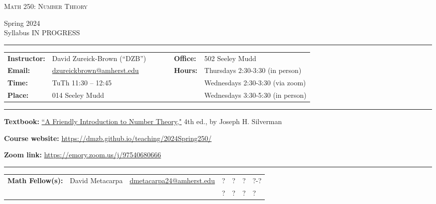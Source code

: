 \documentclass[12pt]{article}
\begin{document}
\begin{center}
{\Large \textsc{Math 250: Number Theory}}
\end{center}
\begin{center}
  Spring 2024
  \\
  {\color{red}Syllabus IN PROGRESS}
\end{center}

\hrule \smallskip

\noindent \begin{tabular}{@{}llcccll}
\textbf{Instructor:} & David Zureick-Brown (``DZB'') & & & & \textbf{Office:} & 502 Seeley Mudd \\
 \textbf{Email:} & \href{mailto: dzureickbrown@amherst.edu}{dzureickbrown@amherst.edu} & & & & \textbf{Hours:} & Thursdays 2:30-3:30 (in person)\\
 \textbf{Time:} & TuTh 11:30 -- 12:45  & & & & &Wednesdays 2:30-3:30 (via zoom) \\
 \textbf{Place:} & 014 Seeley Mudd & & & & & Wednesdays 3:30-5:30 (in person)
\end{tabular}

\smallskip \hrule \medskip

\noindent\textbf{Textbook:}
\href{https://www.math.brown.edu/johsilve/frint.html}
{``A Friendly Introduction to Number Theory,"} 4th ed., by Joseph H. Silverman
\medskip



\noindent\textbf{Course website:} \url{https://dmzb.github.io/teaching/2024Spring250/}
\medskip

\noindent\textbf{Zoom link:} \url{https://emory.zoom.us/j/97540680666}

\smallskip \hrule \medskip

\noindent \begin{tabular}{@{}lllllll}

\textbf{Math Fellow(s):} & David Metacarpa & \href{mailto: dmetacarpa24@amherst.edu}{dmetacarpa24@amherst.edu} 
   & ? &? & ? & ?-? \\
 & &   & ? & ? & ? & ?\\ 


\end{tabular}

\end{document}
